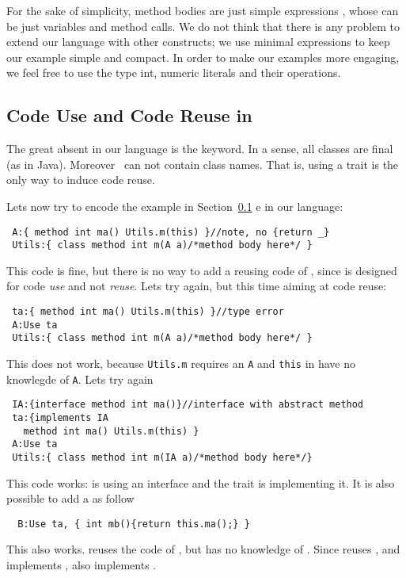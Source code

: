 For the sake of simplicity, method bodies are just simple expressions \me, whose can be just variables and method calls.
We do not think that there is any problem to extend our language with other constructs; we use minimal expressions to keep our example simple and compact. In order to make our examples more engaging, we feel free to use the type int, numeric literals and their operations.

\subsection{Code Use and Code Reuse in \name}

The great absent in our language is the  \Q@extends@ keyword.
In a sense, all classes are final (as in Java).
Moreover  \use\ can not contain class names.
That is, using a trait is the only way to induce code reuse.

Lets now try to encode the example in Section~\ref{} e in our language:

\begin{lstlisting}
 A:{ method int ma() Utils.m(this) }//note, no {return _}
 Utils:{ class method int m(A a)/*method body here*/ }
\end{lstlisting} 

This code is fine, but there is no way to add a \Q@B@ reusing code of \Q@A@, since
\Q@A@ is designed for code \emph{use} and not \emph{reuse}. Lets try
again, but this time aiming at code reuse:

\begin{lstlisting}
 ta:{ method int ma() Utils.m(this) }//type error
 A:Use ta
 Utils:{ class method int m(A a)/*method body here*/ }
\end{lstlisting}

This does not work, because \lstinline{Utils.m} requires an \lstinline{A} and \lstinline{this} in
\Q@ta@ have no knowlegde of \lstinline{A}. Lets try again

\begin{lstlisting}
 IA:{interface method int ma()}//interface with abstract method
 ta:{implements IA
   method int ma() Utils.m(this) }
 A:Use ta
 Utils:{ class method int m(IA a)/*method body here*/}
\end{lstlisting}

This code works: \Q@Utils@ is using an interface \Q@IA@ and the trait \Q@ta@
is implementing it. It is also possible to add a \Q@B@ as follow
\begin{lstlisting}
  B:Use ta, { int mb(){return this.ma();} }
\end{lstlisting}
This also works.  \Q@B@ reuses the code of \Q@ta@, but has no knowledge of \Q@A@.
Since \Q@B@ reuses \Q@ta@, and \Q@ta@ implements \Q@IA@, also \Q@B@ implements \Q@IA@. 

